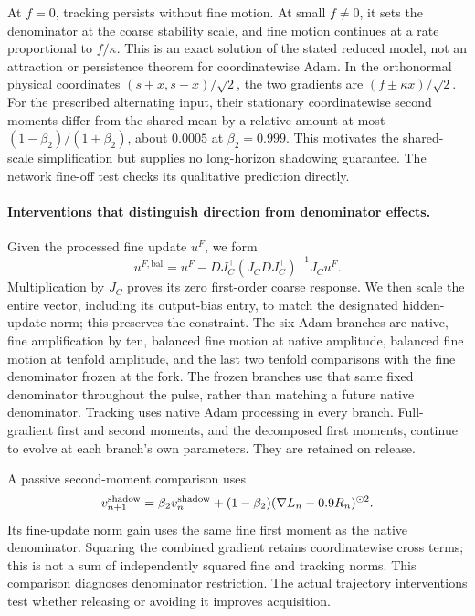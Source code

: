 At $f=0$, tracking persists without fine motion. At small $f\ne0$, it
sets the denominator at the coarse stability scale, and fine motion
continues at a rate proportional to $f/\kappa$. This is an exact solution
of the stated reduced model, not an attraction or persistence theorem
for coordinatewise Adam. In the orthonormal physical coordinates
$(s+x,s-x)/\sqrt2$, the two gradients are $(f\pm\kappa x)/\sqrt2$.
For the prescribed alternating input, their stationary coordinatewise
second moments differ from the shared mean by a relative amount at most
$(1-\beta_2)/(1+\beta_2)$, about $0.0005$ at $\beta_2=0.999$.
This motivates the shared-scale simplification but supplies no
long-horizon shadowing guarantee. The network fine-off test checks its
qualitative prediction directly.

\paragraph{Interventions that distinguish direction from denominator effects.}
Given the processed fine update $u^F$, we form
\begin{equation}
 u^{F,\mathrm{bal}}=u^F-DJ_C^\top(J_CDJ_C^\top)^{-1}J_Cu^F.
 \label{eq:feedback-balanced}
\end{equation}
Multiplication by $J_C$ proves its zero first-order coarse response. We
then scale the entire vector, including its output-bias entry, to match
the designated hidden-update norm; this preserves the constraint.
The six Adam branches are native, fine amplification by ten, balanced
fine motion at native amplitude, balanced fine motion at tenfold
amplitude, and the last two tenfold comparisons with the fine denominator
frozen at the fork. The frozen branches use that same fixed denominator
throughout the pulse, rather than matching a future native denominator.
Tracking uses native Adam processing in every branch. Full-gradient
first and second moments, and the decomposed first moments, continue
to evolve at each branch's own parameters. They are retained on release.

A passive second-moment comparison uses
\[
 v_{n+1}^{\rm shadow}=\beta_2v_n^{\rm shadow}
 +(1-\beta_2)(\nabla L_n-0.9R_n)^{\odot2}.
\]
Its fine-update norm gain uses the same fine first moment as the native
denominator. Squaring the combined gradient retains coordinatewise cross
terms; this is not a sum of independently squared fine and tracking norms.
This comparison diagnoses denominator restriction. The actual trajectory
interventions test whether releasing or avoiding it improves acquisition.

